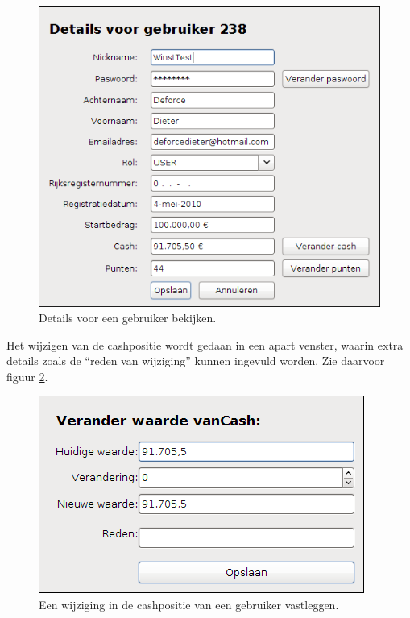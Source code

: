 \begin{figure}[h!]
	\centering
		\includegraphics[scale=0.75]{images/handleiding/administratie/gebruikers-edit}
	\caption{Details voor een gebruiker bekijken.}
		\label{fig:handl:admin:gebruikers-edit}
\end{figure}

Het wijzigen van de cashpositie wordt gedaan in een apart venster, waarin extra details zoals de ``reden van wijziging'' kunnen ingevuld worden. Zie daarvoor figuur \ref{fig:handl:admin:gebruikers-edit-cash}.

\begin{figure}[h!]
	\centering
		\includegraphics[scale=0.75]{images/handleiding/administratie/gebruikers-edit-cash}
	\caption{Een wijziging in de cashpositie van een gebruiker vastleggen.}
			\label{fig:handl:admin:gebruikers-edit-cash}
\end{figure}

